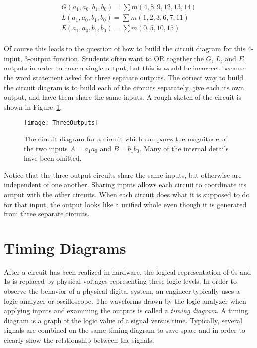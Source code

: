 $$\begin{array}{l}
G(a_1,a_0,b_1,b_0)=\sum m(4,8,9,12,13,14)	\\
L(a_1,a_0,b_1,b_0)=\sum m(1,2,3,6,7,11)	\\
E(a_1,a_0,b_1,b_0)=\sum m(0,5,10,15)	\\
\end{array}$$

Of course this leads to the question of how to build the circuit
diagram for this 4-input, 3-output function.  Students often
want to OR together the $G$, $L$, and $E$ outputs in order to have
a single output, but this is would be incorrect because the word 
statement asked for three separate outputs.  The correct way to build
the circuit diagram is to build each of the circuits separately, give
each its own output, and have them share the same inputs.  A rough
sketch of the circuit is shown in Figure~\ref{fig:representationsThreeOutputs}.

\begin{figure}[ht]
\texttt{[image: ThreeOutputs]}
\caption{The circuit diagram for a circuit which compares the 
magnitude of the two inputs $A=a_1 a_0$ and $B=b_1 b_0$.  Many of 
the internal details have been omitted.}
\label{fig:representationsThreeOutputs}
\end{figure}

Notice that the three output circuits share the same inputs, but otherwise
are independent of one another.  Sharing inputs allows each
circuit to coordinate its output with the other circuits.  When
each circuit does what it is supposed to do for that input, the
output looks like a unified whole even though it is generated from
three separate circuits.

\section{Timing Diagrams}
After a circuit has been realized in hardware, the logical
representation of 0s and 1s is replaced by physical voltages
representing these logic levels.  In order to observe the behavior
of a physical digital system, an engineer typically uses a
logic analyzer or oscilloscope.  The waveforms drawn by the logic
analyzer when applying inputs and examining the outputs is called
a \textit{timing diagram}.  A timing diagram is a graph of the logic value 
of a signal versus time.  Typically, several signals are combined on the
same timing diagram to save space and in order to clearly 
show the relationship between the signals.

